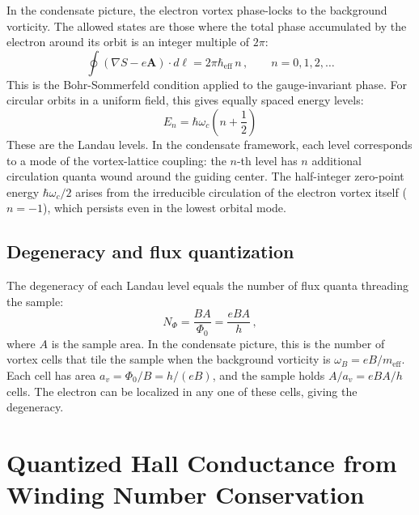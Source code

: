 \documentclass[12pt, a4paper]{article}
\newcommand{\meff}{m_{\mathrm{eff}}}
\newcommand{\heff}{\hbar_{\mathrm{eff}}}
\begin{document}
In the condensate picture, the electron vortex
phase-locks to the background vorticity. The allowed
states are those where the total phase accumulated
by the electron around its orbit is an integer
multiple of $2\pi$:
\begin{equation}
    \oint (\nabla S - e\mathbf{A})\cdot
    d\boldsymbol{\ell} = 2\pi\heff\,n\,,
    \qquad n = 0, 1, 2, \ldots
\label{eq:phase_quantization}
\end{equation}
This is the Bohr-Sommerfeld condition applied to the
gauge-invariant phase. For circular orbits in a
uniform field, this gives equally spaced energy
levels:
\begin{equation}
    \boxed{\;E_n = \hbar\omega_c
    \left(n + \frac{1}{2}\right)\;}
\label{eq:landau}
\end{equation}
These are the Landau levels. In the condensate
framework, each level corresponds to a mode of the
vortex-lattice coupling: the $n$-th level has $n$
additional circulation quanta wound around the
guiding center. The half-integer zero-point energy
$\hbar\omega_c/2$ arises from the irreducible
circulation of the electron vortex itself
($n = -1$), which persists even in the lowest
orbital mode.

\subsection{Degeneracy and flux quantization}

The degeneracy of each Landau level equals the
number of flux quanta threading the sample:
\begin{equation}
    N_\Phi = \frac{BA}{\Phi_0}
    = \frac{eBA}{h}\,,
\label{eq:degeneracy}
\end{equation}
where $A$ is the sample area. In the condensate
picture, this is the number of vortex cells that
tile the sample when the background vorticity is
$\omega_B = eB/\meff$. Each cell has area
$a_v = \Phi_0/B = h/(eB)$, and the sample holds
$A/a_v = eBA/h$ cells. The electron can be
localized in any one of these cells, giving the
degeneracy.


\section{Quantized Hall Conductance from Winding
Number Conservation}
\label{sec:hall}
\end{document}
